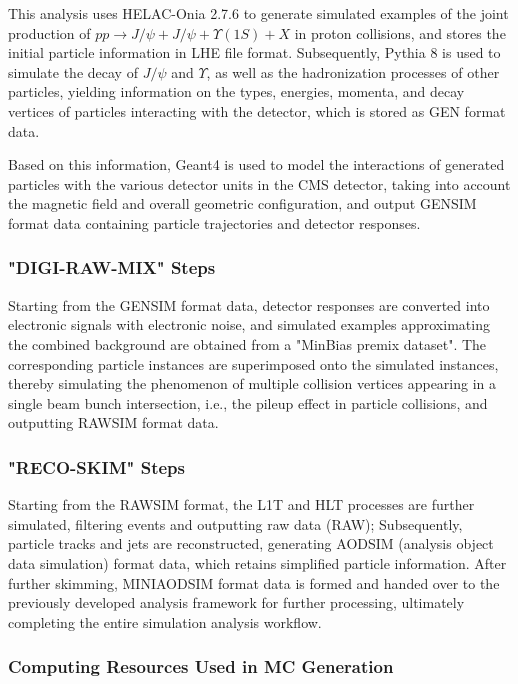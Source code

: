 \documentclass[10pt,twocolumn]{article}
\begin{document}
This analysis uses HELAC-Onia 2.7.6 to generate simulated examples of the joint production of $pp\to J/\psi+J/\psi+\Upsilon(1S)+X$ in proton collisions, and stores the initial particle information in LHE file format. Subsequently, Pythia 8 is used to simulate the decay of $J/\psi$ and $\Upsilon$, as well as the hadronization processes of other particles, yielding information on the types, energies, momenta, and decay vertices of particles interacting with the detector, which is stored as GEN format data.

Based on this information, Geant4 is used to model the interactions of generated particles with the various detector units in the CMS detector, taking into account the magnetic field and overall geometric configuration, and output GENSIM format data containing particle trajectories and detector responses.

\subsubsection{"DIGI-RAW-MIX" Steps}

Starting from the GENSIM format data, detector responses are converted into electronic signals with electronic noise, and simulated examples approximating the combined background are obtained from a "MinBias premix dataset". The corresponding particle instances are superimposed onto the simulated instances, thereby simulating the phenomenon of multiple collision vertices appearing in a single beam bunch intersection, i.e., the pileup effect in particle collisions, and outputting RAWSIM format data.

\subsubsection{"RECO-SKIM" Steps}

Starting from the RAWSIM format, the L1T and HLT processes are further simulated, filtering events and outputting raw data (RAW); Subsequently, particle tracks and jets are reconstructed, generating AODSIM (analysis object data simulation) format data, which retains simplified particle information. After further skimming, MINIAODSIM format data is formed and handed over to the previously developed analysis framework for further processing, ultimately completing the entire simulation analysis workflow.

\subsubsection{Computing Resources Used in MC Generation}
\end{document}

